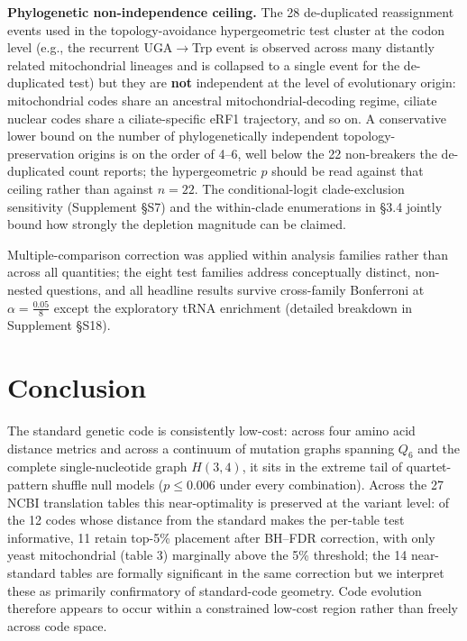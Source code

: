 \documentclass[preprint,11pt,authoryear,a4paper]{elsarticle}
\begin{document}
\textbf{Phylogenetic non-independence ceiling.} The 28 de-duplicated
reassignment events used in the topology-avoidance hypergeometric test
cluster at the codon level (e.g., the recurrent UGA\(\rightarrow\)Trp
event is observed across many distantly related mitochondrial lineages
and is collapsed to a single event for the de-duplicated test) but they
are \textbf{not} independent at the level of evolutionary origin:
mitochondrial codes share an ancestral mitochondrial-decoding regime,
ciliate nuclear codes share a ciliate-specific eRF1 trajectory, and so
on. A conservative lower bound on the number of phylogenetically
independent topology-preservation origins is on the order of 4--6, well
below the 22 non-breakers the de-duplicated count reports; the
hypergeometric \(p\) should be read against that ceiling rather than
against \(n = 22\). The conditional-logit clade-exclusion sensitivity
(Supplement §S7) and the within-clade enumerations in §3.4 jointly bound
how strongly the depletion magnitude can be claimed.

Multiple-comparison correction was applied within analysis families
rather than across all quantities; the eight test families address
conceptually distinct, non-nested questions, and all headline results
survive cross-family Bonferroni at \(\alpha = \frac{0.05}{8}\) except
the exploratory tRNA enrichment (detailed breakdown in Supplement §S18).

\section{Conclusion}\label{sec:conclusion}

The standard genetic code is consistently low-cost: across four amino
acid distance metrics and across a continuum of mutation graphs spanning
\(Q_{6}\) and the complete single-nucleotide graph \(H(3,4)\), it sits
in the extreme tail of quartet-pattern shuffle null models
(\(p \leq 0.006\) under every combination). Across the 27 NCBI
translation tables this near-optimality is preserved at the variant
level: of the 12 codes whose distance from the standard makes the
per-table test informative, 11 retain top-5\% placement after BH--FDR
correction, with only yeast mitochondrial (table 3) marginally above the
5\% threshold; the 14 near-standard tables are formally significant in
the same correction but we interpret these as primarily confirmatory of
standard-code geometry. Code evolution therefore appears to occur within
a constrained low-cost region rather than freely across code space.
\end{document}
